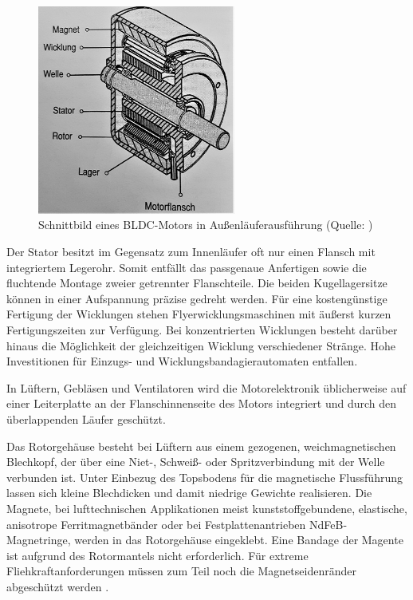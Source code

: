 \begin{figure}[h]
  \centering
  \includegraphics[width=6.5cm]{./Grafiken/3_2}
  \caption[Schnittbild eines BLDC-Motors in Außenläuferausführung]{Schnittbild eines BLDC-Motors in Außenläuferausführung (Quelle: \parencite[S. 76]{Stölting2011})}
  \label{fig:3_2}
\end{figure}

Der Stator besitzt im Gegensatz zum Innenläufer oft nur einen Flansch mit integriertem Legerohr. Somit entfällt das passgenaue Anfertigen sowie die fluchtende Montage zweier getrennter Flanschteile. Die beiden Kugellagersitze können in einer Aufspannung präzise gedreht werden. Für eine kostengünstige Fertigung der Wicklungen stehen Flyerwicklungsmaschinen mit äußerst kurzen Fertigungszeiten zur Verfügung. Bei konzentrierten Wicklungen besteht darüber hinaus die Möglichkeit der gleichzeitigen Wicklung verschiedener Stränge. Hohe Investitionen für Einzugs- und Wicklungsbandagierautomaten entfallen.

In Lüftern, Gebläsen und Ventilatoren wird die Motorelektronik üblicherweise auf einer Leiterplatte an der Flanschinnenseite des Motors integriert und durch den überlappenden Läufer geschützt.

Das Rotorgehäuse besteht bei Lüftern aus einem gezogenen, weichmagnetischen Blechkopf, der über eine Niet-, Schweiß- oder Spritzverbindung mit der Welle verbunden ist. Unter Einbezug des Topsbodens für die magnetische Flussführung lassen sich kleine Blechdicken und damit niedrige Gewichte realisieren. Die Magnete, bei lufttechnischen Applikationen meist kunststoffgebundene, elastische, anisotrope Ferritmagnetbänder oder bei Festplattenantrieben NdFeB-Magnetringe, werden in das Rotorgehäuse eingeklebt. Eine Bandage der Magente ist aufgrund des Rotormantels nicht erforderlich. Für extreme Fliehkraftanforderungen müssen zum Teil noch die Magnetseidenränder abgeschützt werden \parencite[S. 76--77]{Stölting2011}.

